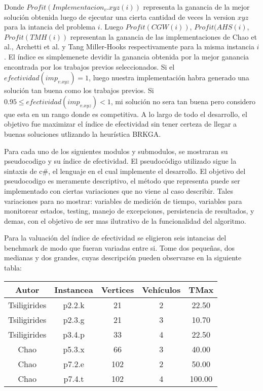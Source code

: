 Donde $Profit(Implementacion_v.xyz(i))$ representa la ganancia de la mejor solución obtenida luego de ejecutar una cierta cantidad de veces la version $xyz$ para la intancia del problema $i$. Luego $Profit(CGW(i))$, $Profit(AHS(i)$, $Profit(TMH(i))$ representan la ganancia de las implementaciones de Chao et al., Archetti et al. y Tang Miller-Hooks respectivamente para la misma instancia $i$. El índice es simplemenete devidir la ganancia obtenida por la mejor ganancia encontrada por los trabajos previos seleccionados. Si el $efectividad(imp_{v.xyz}) = 1$, luego nuestra implementación habra generado una solución tan buena como los trabajos previos. Si $0.95 \leq efectividad(imp_{v.xyz}) < 1$, mi solución no sera tan buena pero considero que esta en un rango donde es  competitiva. A lo largo de todo el desarrollo, el objetivo fue maximizar el índice de efectividad sin tener certeza de llegar a buenas soluciones utlizando la heurística BRKGA.

\bigskip

Para cada uno de los siguientes modulos y submodulos, se mostraran su pseudocodigo y su índice de efectividad. El pseudocódigo utilizado sigue la sintaxis de c\#, el lenguaje en el cual implemente el desarrollo. El objetivo del pseudocodigo es meramente descriptivo, el método que representa puede ser implementado con ciertas variaciones que no viene al caso describir. Tales variaciones para no mostrar: variables de medición de tiempo, variables para monitorear estados, testing, manejo de excepciones, persistencia de resultados, y demas, con el objetivo de ser mas ilutrativo de la funcionalidad del algoritmo. 


\bigskip

Para la valuación del índice de efectividad se eligieron seis intancias del benchmark de modo que fueran variadas entre si. Tome dos pequeñas, dos medianas y dos grandes, cuyas descripción pueden observarse en la siguiente tabla:

\begin{center}
\begin{tabular}{ |c|c|c|c|c| } 
 \hline
Autor & Instancea & Vertices & Vehículos & TMax \\
\hline
Tsiligirides & p2.2.k & 21 & 2 & 22.50 \\
Tsiligirides & p2.3.g & 21 & 3 & 10.70 \\
Tsiligirides & p3.4.p & 33 & 4 & 22.50 \\
Chao & p5.3.x & 66 & 3 & 40.00 \\
Chao & p7.2.e & 102 & 2 & 50.00 \\
Chao & p7.4.t & 102 & 4 & 100.00 \\
 \hline
\end{tabular}
\end{center}


